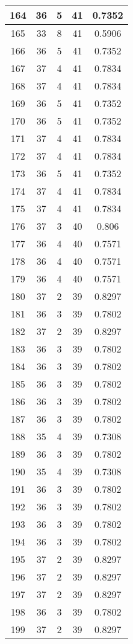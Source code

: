 \documentclass[letterpaper, 12pt]{article}
\begin{document}
\begin{longtable}{|c|c|c|c|c|}
\hline
164 & 36 & 5 & 41 & 0.7352 \\
\hline
165 & 33 & 8 & 41 & 0.5906 \\
\hline
166 & 36 & 5 & 41 & 0.7352 \\
\hline
167 & 37 & 4 & 41 & 0.7834 \\
\hline
168 & 37 & 4 & 41 & 0.7834 \\
\hline
169 & 36 & 5 & 41 & 0.7352 \\
\hline
170 & 36 & 5 & 41 & 0.7352 \\
\hline
171 & 37 & 4 & 41 & 0.7834 \\
\hline
172 & 37 & 4 & 41 & 0.7834 \\
\hline
173 & 36 & 5 & 41 & 0.7352 \\
\hline
174 & 37 & 4 & 41 & 0.7834 \\
\hline
175 & 37 & 4 & 41 & 0.7834 \\
\hline
176 & 37 & 3 & 40 & 0.806 \\
\hline
177 & 36 & 4 & 40 & 0.7571 \\
\hline
178 & 36 & 4 & 40 & 0.7571 \\
\hline
179 & 36 & 4 & 40 & 0.7571 \\
\hline
180 & 37 & 2 & 39 & 0.8297 \\
\hline
181 & 36 & 3 & 39 & 0.7802 \\
\hline
182 & 37 & 2 & 39 & 0.8297 \\
\hline
183 & 36 & 3 & 39 & 0.7802 \\
\hline
184 & 36 & 3 & 39 & 0.7802 \\
\hline
185 & 36 & 3 & 39 & 0.7802 \\
\hline
186 & 36 & 3 & 39 & 0.7802 \\
\hline
187 & 36 & 3 & 39 & 0.7802 \\
\hline
188 & 35 & 4 & 39 & 0.7308 \\
\hline
189 & 36 & 3 & 39 & 0.7802 \\
\hline
190 & 35 & 4 & 39 & 0.7308 \\
\hline
191 & 36 & 3 & 39 & 0.7802 \\
\hline
192 & 36 & 3 & 39 & 0.7802 \\
\hline
193 & 36 & 3 & 39 & 0.7802 \\
\hline
194 & 36 & 3 & 39 & 0.7802 \\
\hline
195 & 37 & 2 & 39 & 0.8297 \\
\hline
196 & 37 & 2 & 39 & 0.8297 \\
\hline
197 & 37 & 2 & 39 & 0.8297 \\
\hline
198 & 36 & 3 & 39 & 0.7802 \\
\hline
199 & 37 & 2 & 39 & 0.8297 \\
\hline
\end{longtable}
\end{document}

